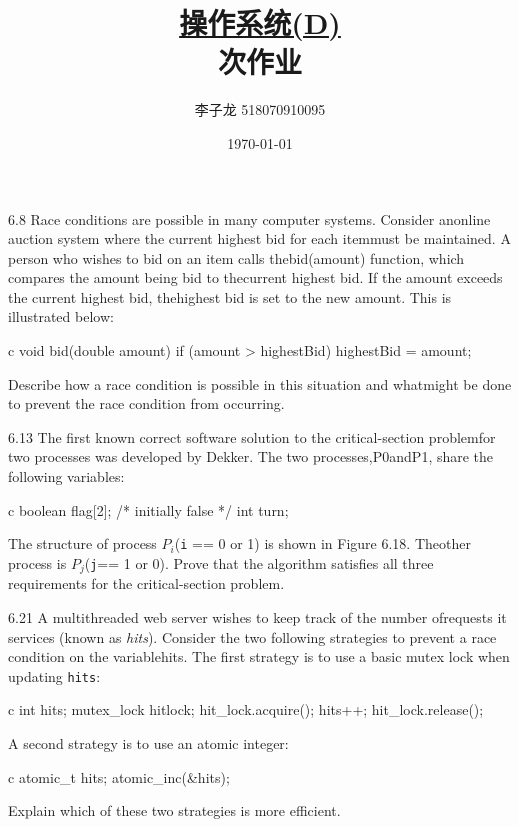 \documentclass[12pt,a4paper]{article}
\newenvironment{problems}{\begin{list}{}{\renewcommand{\makelabel}[1]{\textbf{##1}\hfil}}}{\end{list}}
\begin{document}
\title{\normalsize \underline{操作系统(D)}\\ 次作业}
\author{李子龙 518070910095}
\date{\today}
\maketitle

\begin{problems}
    \item[6.8] Race conditions are possible in many computer systems. Consider anonline auction system where the current highest bid for each itemmust be maintained. A person who wishes to bid on an item calls thebid(amount) function, which compares the amount being bid to thecurrent highest bid. If the amount exceeds the current highest bid, thehighest bid is set to the new amount. This is illustrated below:
    \begin{code}{c}
        void bid(double amount){
            if (amount > highestBid)      
                highestBid = amount;
        }
    \end{code} 
    Describe how a race condition is possible in this situation and whatmight be done to prevent the race condition from occurring.
    \item[6.13] The first known correct software solution to the critical-section problemfor two processes was developed by Dekker. The two processes,P0andP1, share the following variables:
    \begin{code}{c}
        boolean flag[2]; /* initially false */
        int turn;
    \end{code} 
    The structure of process $P_i$(\verb"i" == 0 or 1) is shown in Figure 6.18. Theother process is $P_j$(\verb"j"== 1 or 0). Prove that the algorithm satisfies all three requirements for the critical-section problem.
    \item[6.21] A multithreaded web server wishes to keep track of the number ofrequests it services (known as \emph{hits}). Consider the two following strategies to prevent a race condition on the variablehits. The first strategy is to use a basic mutex lock when updating \verb"hits":
    \begin{code}{c}
        int hits;
        mutex_lock hitlock;
        hit_lock.acquire();
        hits++;
        hit_lock.release();
    \end{code} 
    A second strategy is to use an atomic integer:
    \begin{code}{c}
        atomic_t hits;
        atomic_inc(&hits);
    \end{code}
    Explain which of these two strategies is more efficient.

\end{problems}
\end{document}
